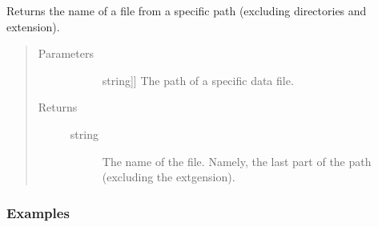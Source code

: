 \documentclass[letterpaper,10pt,english]{sphinxmanual}
\begin{document}
\begin{fulllineitems}
\label{\detokenize{index:gps2net.getFilename}}
Returns the name of a file from a specific path (excluding directories and extension).
\begin{quote}\begin{description}
\item[{Parameters}] \leavevmode\begin{description}
\item[{}] \leavevmode{[}{[}string{]}{]}
The path of a specific data file.

\end{description}

\item[{Returns}] \leavevmode\begin{description}
\item[{string}] \leavevmode
The name of the file. Namely, the last part of the path (excluding the extgension).

\end{description}

\end{description}\end{quote}
\subsubsection*{Examples}

\begin{sphinxVerbatim}[commandchars=\\\{\}]
  
  
\end{sphinxVerbatim}

\end{fulllineitems}

\end{document}
